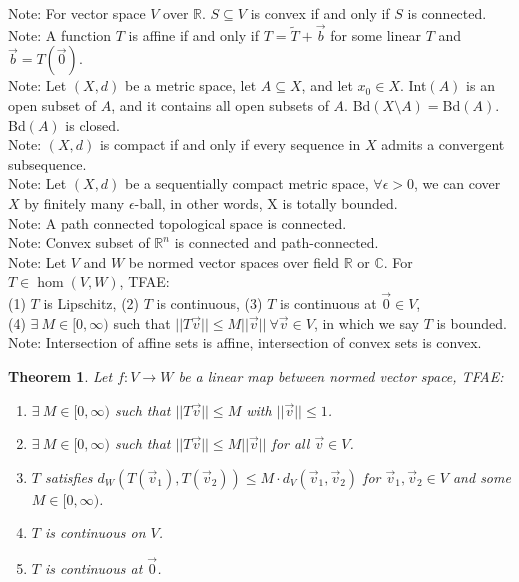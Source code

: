 \documentclass[11pt]{article}
\theoremstyle{break}
\theoremstyle{break}
\newtheorem{thm}{Theorem}[section]
\newcommand{\R}{\mathbb{R}}
\newcommand{\Complex}{\mathbb{C}}
\newcommand{\note}{\color{red}Note: \color{black}}
\begin{document}
\note For vector space $V$ over $\R$. $S\subseteq V$ is convex if and only if $S$ is connected. \\
\note A function $T$ is affine if and only if $T = \widetilde{T} + \vec{b}$  for some linear $T$ and $\vec{b} = T(\vec{0})$.\\
\note Let $(X,d)$ be a metric space, let $A \subseteq X$, and let $x_0 \in X$. Int$(A)$ is an open subset of $A$, and it contains all open subsets of $A$. Bd$(X\setminus A) =$Bd$(A)$. Bd$(A)$ is closed.\\
\note $(X, d)$ is compact if and only if every sequence in $X$ admits a convergent subsequence.\\
\note Let $(X, d)$ be a sequentially compact metric space, $\forall \epsilon > 0$, we can cover $X$ by finitely many $\epsilon$-ball, in other words, X is totally bounded.\\
\note A path connected topological space is connected.\\
\note Convex subset of $\R^n$ is connected and path-connected.\\
\note Let $V$ and $W$ be normed vector spaces over field $\R$ or $\Complex$. For $T \in \hom(V,W)$, TFAE:\\
(1) $T$ is Lipschitz, (2) $T$ is continuous, (3) $T$ is continuous at $\vec{0}\in V$, 
\\(4) $\exists\ M \in [0,\infty)$ such that $||T\vec{v}|| \leq M||\vec{v}||\ \forall \vec{v}\in V$, in which we say $T$ is bounded.\\
\note Intersection of affine sets is affine, intersection of convex sets is convex.

\newpage
\begin{thm}
Let $f: V\to W$ be a linear map between normed vector space, TFAE:
\begin{enumerate}[topsep=3pt,itemsep=-1ex,partopsep=1ex,parsep=1ex]
\item $\exists\ M \in [0,\infty)$ such that $||T{\vec{v}}|| \leq M $ with $||\vec{v}|| \leq 1$.
\item $\exists\ M \in [0,\infty)$ such that $||T{\vec{v}}|| \leq M||\vec{v}||$ for all $\vec{v}\in V$.
\item $T$ satisfies $d_W(T(\vec{v}_1),T(\vec{v}_2)) \leq M \cdot d_V(\vec{v}_1,\vec{v}_2)$ for $\vec{v}_1,\vec{v}_2 \in V$ and some $M \in [0,\infty)$.
\item $T$ is continuous on $V$. \item $T$ is continuous at $\vec{0}$. 
\end{enumerate}
\end{thm}
\end{document}
